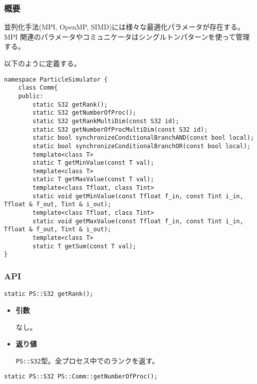 \subsubsection{概要}

並列化手法(MPI, OpenMP, SIMD)には様々な最適化パラメータが存在する。MPI
関連のパラメータやコミュニケータはシングルトンパターンを使って管理する。

以下のように定義する。

\begin{lstlisting}[caption={\tt Comm}の定義]
namespace ParticleSimulator {
    class Comm{
    public:
        static S32 getRank();
        static S32 getNumberOfProc();
        static S32 getRankMultiDim(const S32 id);
        static S32 getNumberOfProcMultiDim(const S32 id);
        static bool synchronizeConditionalBranchAND(const bool local);        
        static bool synchronizeConditionalBranchOR(const bool local);        
        template<class T>
        static T getMinValue(const T val);
        template<class T>
        static T getMaxValue(const T val);
        template<class Tfloat, class Tint>
        static void getMinValue(const Tfloat f_in, const Tint i_in, Tfloat & f_out, Tint & i_out);
        template<class Tfloat, class Tint>
        static void getMaxValue(const Tfloat f_in, const Tint i_in, Tfloat & f_out, Tint & i_out);
        template<class T>
        static T getSum(const T val);
}
\end{lstlisting}

\subsubsection{API}

\begin{screen}
\begin{verbatim}
static PS::S32 getRank();
\end{verbatim}
\end{screen}

\begin{itemize}

\item{{\bf 引数}}

なし。

\item{{\bf 返り値}}

{\tt PS::S32}型。全プロセス中でのランクを返す。

\end{itemize}

\begin{screen}
\begin{verbatim}
static PS::S32 PS::Comm::getNumberOfProc();
\end{verbatim}
\end{screen}

